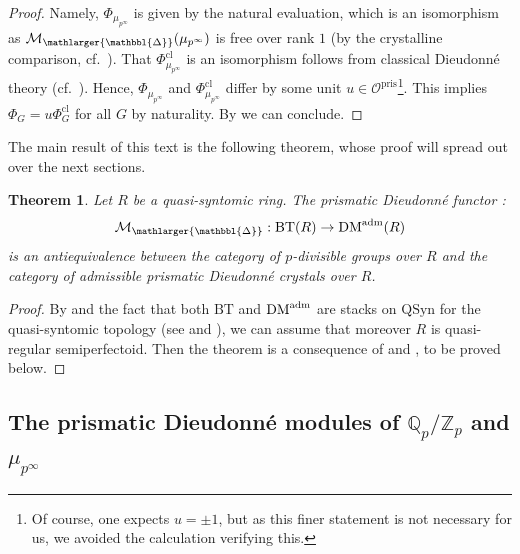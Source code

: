 \documentclass{amsart}
\newcommand{\prism}{{\mathlarger{\mathbbl{\Delta}}}}
\theoremstyle{plain}
\newtheorem{theorem}{Theorem}[subsection]
\theoremstyle{definition}
\newcommand{\pris}{\mathrm{pris}}
\newcommand{\Q}{\mathbb{Q}}
\newcommand{\Z}{\mathbb{Z}}
\newcommand{\DM}{\mathrm{DM}}
\newcommand{\purple}[1]{{\color{black} #1}}
\newcommand{\red}[1]{{\color{black} #1}}
\begin{document}
\begin{proof}
Namely, $\Phi_{\mu_{p^\infty}}$ is given by the natural evaluation, which is an isomorphism as $\mathcal{M}_{\prism}(\mu_{p^\infty})$ is free over rank $1$ (by the crystalline comparison, cf.\ ). That $\Phi_{\mu_{p^\infty}}^{\mathrm{cl}}$ is an isomorphism follows from classical Dieudonn\'e theory (cf.\ \cite[Proposition 5.1.iii)]{fontaine_groupes_p_divisibles_sur_les_corps_locaux}). Hence, $\Phi_{\mu_{p^\infty}}$ and $\Phi^{\mathrm{cl}}_{\mu_{p^\infty}}$ differ by some unit $u\in \mathcal{O}^\pris$\footnote{Of course, one expects $u=\pm 1$, but as this finer statement is not necessary for us, we avoided the calculation verifying this.}. This implies $\Phi_G=u\Phi^{\mathrm{cl}}_G$ for all $G$ by naturality. By \cite[Proposition 5.1.iii)]{fontaine_groupes_p_divisibles_sur_les_corps_locaux} we can conclude.
\end{proof}


The main result of this text is the following theorem, whose proof will spread out over the next sections.

\begin{theorem} 
\label{sec:divid-prism-dieud-modul-theorem-main-theorem-of-the-paper}
\purple{Let $R$ be a quasi-syntomic ring.} The \red{prismatic Dieudonn\'e functor :
\[ \mathcal{M}_{\prism} : \mathrm{BT}(R) \to \DM^{\rm adm}(R) \]
is an antiequivalence between the category of $p$-divisible groups over $R$ and the category of admissible prismatic Dieudonn\'e crystals over $R$.}
\end{theorem}

\begin{proof}
By  and the fact that both $\mathrm{BT}$ and \red{$\DM^{\rm adm}$} are stacks on $\mathrm{QSyn}$ for the quasi-syntomic topology (see    and ), we can assume that moreover $R$ is quasi-regular semiperfectoid. Then the theorem is a consequence of  and , to be proved below.
\end{proof}


\subsection{The prismatic Dieudonn\'e modules of $\Q_p/\Z_p$ and $\mu_{p^\infty}$}
\label{sec:prism-dieud-modul}
\end{document}
